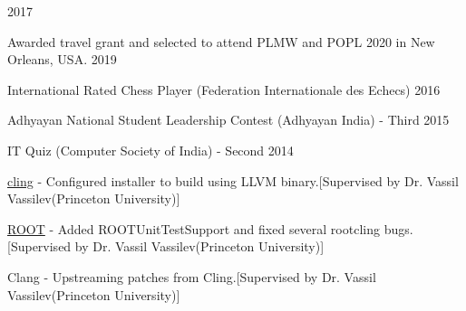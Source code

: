 \documentclass[10pt, letterpaper]{fulldeps}
\begin{document}
\hfill{2017}\\
\vspace{-15pt}
\pagebreak

%
%

%
%
\begin{tightitemize}
    \item Awarded travel grant and selected to attend PLMW and POPL 2020 in New Orleans, USA. \hfill{2019}
    \item International Rated Chess Player (Federation Internationale des Echecs) \hfill{2016}
    \item Adhyayan National Student Leadership Contest (Adhyayan India) - Third \hfill{2015}
    \item IT Quiz (Computer Society of India) - Second \hfill{2014}
\end{tightitemize}

\begin{tightitemize}
\item {\href{https://github.com/root-project/cling}{cling}} - Configured installer to build using LLVM binary.[Supervised by Dr. Vassil Vassilev(Princeton University)]
\item {\href{https://github.com/root-project/root}{ROOT}} - Added ROOTUnitTestSupport and fixed several rootcling bugs.[Supervised by Dr. Vassil Vassilev(Princeton University)]
\item {Clang} - Upstreaming patches from Cling.[Supervised by Dr. Vassil Vassilev(Princeton University)]
\end{tightitemize}
\end{document}

